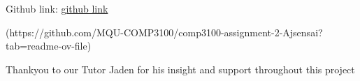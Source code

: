 Github link:  \href{https://github.com/MQU-COMP3100/comp3100-assignment-2-Ajsensai?tab=readme-ov-file}{github link}

(https://github.com/MQU-COMP3100/comp3100-assignment-2-Ajsensai?tab=readme-ov-file)

Thankyou to our Tutor Jaden for his insight and support throughout this project